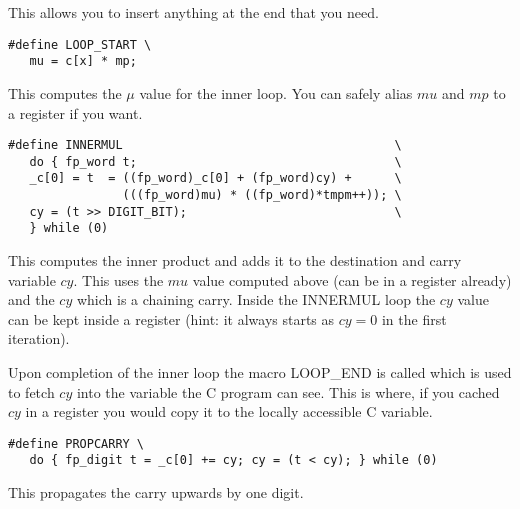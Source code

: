 \documentclass[b5paper]{book}
\begin{document}
This allows you to insert anything at the end that you need.

\begin{verbatim}
#define LOOP_START \
   mu = c[x] * mp;
\end{verbatim}

This computes the $\mu$ value for the inner loop.  You can safely alias $mu$ and $mp$ to
a register if you want.

\begin{verbatim}
#define INNERMUL                                      \
   do { fp_word t;                                    \
   _c[0] = t  = ((fp_word)_c[0] + (fp_word)cy) +      \
                (((fp_word)mu) * ((fp_word)*tmpm++)); \
   cy = (t >> DIGIT_BIT);                             \
   } while (0)
\end{verbatim}

This computes the inner product and adds it to the destination and carry variable $cy$.
This uses the $mu$ value computed above (can be in a register already) and the 
$cy$ which is a chaining carry.  Inside the INNERMUL loop the $cy$ value can be kept
inside a register (hint: it always starts as $cy = 0$ in the first iteration).

Upon completion of the inner loop the macro LOOP\_END is called which is used to fetch
$cy$ into the variable the C program can see.  This is where, if you cached $cy$ in a
register you would copy it to the locally accessible C variable.

\begin{verbatim}
#define PROPCARRY \
   do { fp_digit t = _c[0] += cy; cy = (t < cy); } while (0)
\end{verbatim}

This propagates the carry upwards by one digit.  


\end{document}

